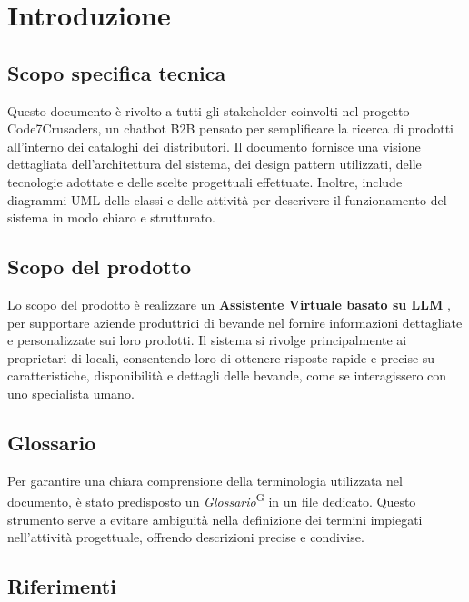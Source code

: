\section{Introduzione}

\subsection{Scopo specifica tecnica}
Questo documento è rivolto a tutti gli stakeholder coinvolti nel progetto Code7Crusaders, un chatbot B2B pensato per semplificare la ricerca di prodotti all'interno dei cataloghi dei distributori.
Il documento fornisce una visione dettagliata dell’architettura del sistema, dei design pattern utilizzati, delle tecnologie adottate e delle scelte progettuali effettuate. Inoltre, include diagrammi UML delle classi e delle attività per descrivere il funzionamento del sistema in modo chiaro e strutturato.
  
\subsection{Scopo del prodotto}
Lo scopo del prodotto è realizzare un \textbf{Assistente Virtuale basato su LLM }, 
per supportare aziende produttrici di bevande nel fornire 
informazioni dettagliate e personalizzate sui loro prodotti. 
Il sistema si rivolge principalmente ai proprietari di locali, 
consentendo loro di ottenere risposte rapide e precise su caratteristiche, 
disponibilità e dettagli delle bevande, come se interagissero con uno specialista umano.

\subsection{Glossario}
Per garantire una chiara comprensione della terminologia utilizzata nel documento,
è stato predisposto un \href{https://code7crusaders.github.io/docs/PB/documentazione_interna/glossario.html#glossario}{\emph{Glossario}\textsuperscript{G}} in un file dedicato. Questo strumento 
serve a evitare ambiguità nella definizione dei termini impiegati nell’attività progettuale, 
offrendo descrizioni precise e condivise. 


\subsection{Riferimenti}
